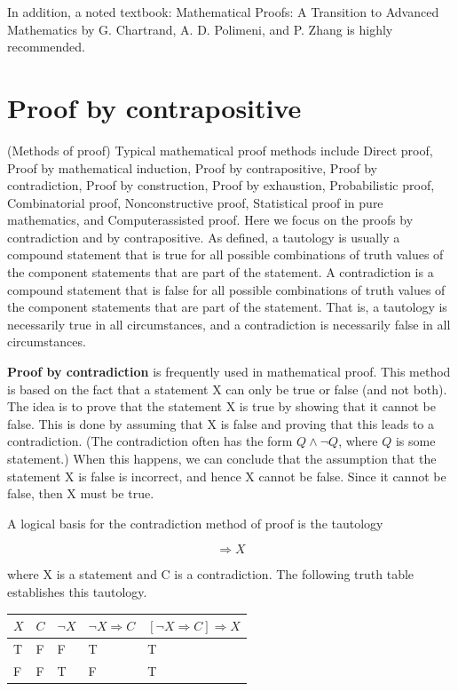 \documentclass{article}
\begin{document}
In addition, a noted textbook: Mathematical Proofs: A Transition to Advanced Mathematics by G. Chartrand, A. D. Polimeni, and P. Zhang is highly recommended.





\section{Proof by contrapositive}

(Methods of proof) Typical mathematical proof methods include Direct proof, Proof by mathematical induction, Proof by contrapositive, Proof by contradiction, Proof by construction, Proof by exhaustion, Probabilistic proof, Combinatorial proof, Nonconstructive proof, Statistical proof in pure mathematics, and Computerassisted proof. Here we focus on the proofs by contradiction and by contrapositive. As defined, a tautology is usually a compound statement that is true for all possible combinations of truth values of the component statements that are part of the statement. A contradiction is a compound statement that is false for all possible combinations of truth values of the component statements that are part of the statement. That is, a tautology is necessarily true in all circumstances, and a contradiction is necessarily false in all circumstances.

\textbf{Proof by contradiction} is frequently used in mathematical proof. This method is based on the fact that a statement X can only be true or false (and not both). The idea is to prove that the statement X is true by showing that it cannot be false. This is done by assuming that X is false and proving that this leads to a contradiction. (The contradiction often has the form $Q \land \lnot Q$, where $Q$ is some statement.) When this happens, we can conclude that the assumption that the statement X is false is incorrect, and hence X cannot be false. Since it cannot be false, then X must be true.

A logical basis for the contradiction method of proof is the tautology

\begin{equation*}
  [\lnot X \Rightarrow C] \Rightarrow X
\end{equation*}

where X is a statement and C is a contradiction. The following truth table establishes this tautology.

\begin{table}
  \begin{center}
    \begin{tabular}{l|l|l|l|l}
$X$ & $C$ & $\lnot X$ & $\lnot X \Rightarrow C$ & $[\lnot X \Rightarrow C] \Rightarrow X$ \\
\hline
T & F & F & T & T \\
F & F & T & F & T \\
    \end{tabular}    
  \end{center}
\end{table}
\end{document}
